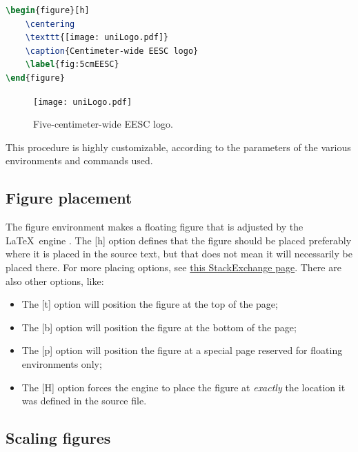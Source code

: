 \begin{lstlisting}[caption = {5cm-wide EESC logo (figure \ref{fig:5cmEESC}).}, label = {lst:5cmEESC}, style = prettyListing, language = tex]
\begin{figure}[h]
	\centering
	\texttt{[image: uniLogo.pdf]}
	\caption{Centimeter-wide EESC logo}
	\label{fig:5cmEESC}
\end{figure}
\end{lstlisting}

\begin{figure}[h]
	\centering
	\texttt{[image: uniLogo.pdf]}
	\caption{Five-centimeter-wide EESC logo.}
	\label{fig:5cmEESC}
\end{figure}

	This procedure is highly customizable, according to the parameters of the various environments and commands used.

	\subsection{Figure placement}

	 The {\ttfamily\small figure} environment makes a floating figure that is adjusted by the \LaTeX\ engine . The {\ttfamily\small [h]} option defines that the figure should be placed preferably where it is placed in the source text, but that does not mean it will necessarily be placed there. For more placing options, see \href{https://tex.stackexchange.com/questions/35125/how-to-use-the-placement-options-t-h-with-figures}{this StackExchange page}. There are also other options, like:

\begin{itemize}
	\item The {\ttfamily\small [t]} option will position the figure at the top of the page;
	\item The {\ttfamily\small [b]} option will position the figure at the bottom of the page;
	\item The {\ttfamily\small [p]} option will position the figure at a special page reserved for floating environments only;
	\item The {\ttfamily\small [H]} option forces the engine to place the figure at \textit{exactly} the location it was defined in the source file.
\end{itemize}

	\subsection{Scaling figures}

